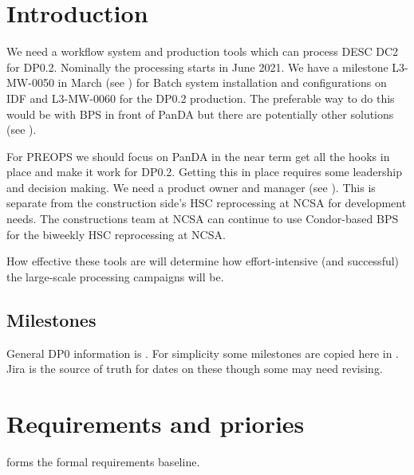 \section{Introduction}

We need a workflow system and production tools which can process DESC DC2 for DP0.2. Nominally the processing starts in June 2021.
We have a milestone L3-MW-0050 in March (see ) for Batch system installation and configurations on IDF and L3-MW-0060 for the DP0.2 production.
The preferable way to do this would be with BPS in front of PanDA but there are potentially other solutions (see ).

For PREOPS we should focus on PanDA in the near term get all the hooks in place and make it work for DP0.2.
Getting this in place requires some leadership and decision making. We need a product owner and manager  (see ).
This is separate from the construction side's HSC reprocessing at NCSA for development needs. The  constructions team at NCSA can continue to use Condor-based BPS for the biweekly HSC reprocessing at NCSA.

How effective these tools are will determine how effort-intensive (and successful) the large-scale processing campaigns will be.


\subsection{Milestones}
General DP0 information is  . For simplicity some  milestones
are copied here in . Jira is the source of truth for dates on these though some may need revising.


\section {Requirements and priories}
 forms the formal requirements baseline.

